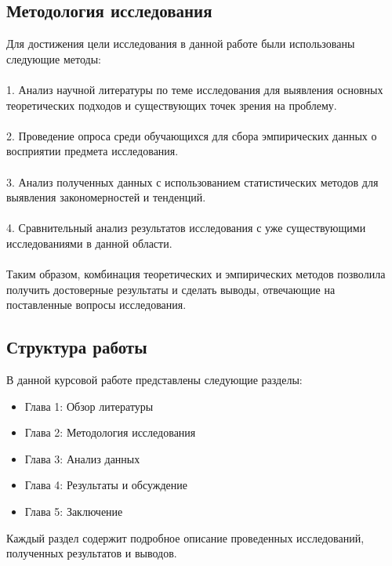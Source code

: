 \documentclass{article}
\begin{document}
\subsection{Методология исследования}
Для достижения цели исследования в данной работе были использованы следующие методы:\\
~\\
1. Анализ научной литературы по теме исследования для выявления основных теоретических подходов и существующих точек зрения на проблему.\\
~\\
2. Проведение опроса среди обучающихся для сбора эмпирических данных о восприятии предмета исследования.\\
~\\
3. Анализ полученных данных с использованием статистических методов для выявления закономерностей и тенденций.\\
~\\
4. Сравнительный анализ результатов исследования с уже существующими исследованиями в данной области.\\
~\\
Таким образом, комбинация теоретических и эмпирических методов позволила получить достоверные результаты и сделать выводы, отвечающие на поставленные вопросы исследования.
\subsection{Структура работы}
В данной курсовой работе представлены следующие разделы:
\begin{itemize}
\item Глава 1: Обзор литературы
\item Глава 2: Методология исследования
\item Глава 3: Анализ данных
\item Глава 4: Результаты и обсуждение
\item Глава 5: Заключение
\end{itemize}
Каждый раздел содержит подробное описание проведенных исследований, полученных результатов и выводов.\\
~\\

\newpage
\end{document}

